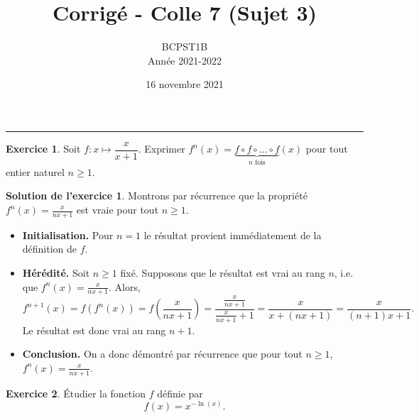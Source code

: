 \documentclass[a4paper, 11pt,openany]{article}%
\title{Corrigé - Colle 7 (Sujet 3)}
\author{BCPST1B\\
Année 2021-2022}
\date{16 novembre 2021}
\theoremstyle{plain}
\theoremstyle{definition}
\newtheorem{exo}{Exercice}
\newtheorem{sol}{Solution de l'exercice}
\theoremstyle{remark}
\begin{document}
   \maketitle
      \rule{\linewidth}{0.5mm}


\begin{exo}
Soit $f\colon x \mapsto \dfrac{x}{x+1}$. Exprimer $f^n(x) = \underbrace{f\circ f \circ \ldots \circ f}_{n\text{ fois}}(x)$ pour tout entier naturel $n \geqslant 1$.
\end{exo}

\begin{sol}
Montrons par récurrence que la propriété $f^n(x) = \frac{x}{nx+1}$ est vraie pour tout $n \geqslant 1$.
\begin{itemize}
\item \textbf{Initialisation.} Pour $n=1$ le résultat provient immédiatement de la définition de $f$.
\item \textbf{Hérédité.} Soit $n \geqslant 1$ fixé. Supposons que le résultat est vrai au rang $n$, i.e. que $f^n(x) = \frac{x}{nx+1}$. Alors,
\[ f^{n+1}(x) = f(f^n(x)) = f \left( \frac{x}{nx+1} \right) = \frac{\frac{x}{nx+1}}{\frac{x}{nx+1} +1 } = \frac{x}{x+(nx+1)} = \frac{x}{(n+1)x+1}.\]
Le résultat est donc vrai au rang $n+1$.
\item \textbf{Conclusion.} On a donc démontré par récurrence que pour tout $n \geqslant 1$, $f^n(x) = \frac{x}{nx+1}$.
\end{itemize}
\end{sol}

\begin{exo}
Étudier la fonction $f$ définie par
\[ f(x) = x^{-\ln(x)}.\]
\end{exo}
\end{document}
